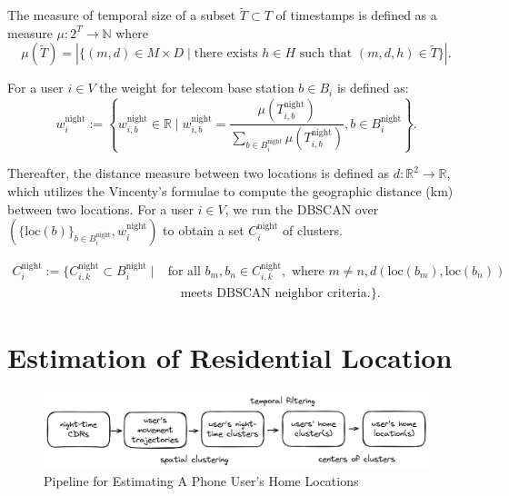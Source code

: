 \begin{function}
The measure of temporal size of a subset $\tilde{T} \subset T$ of timestamps is defined as a measure  $\mu: 2^T \rightarrow \mathbb{N}$ where
\begin{equation}\label{eq:temporal_size}
\mu(\tilde{T}) =
|
\{
(m, d) \in M \times D
\mid
\text{there exists } h \in H \text{ such that } (m, d, h) \in \tilde{T}
\}
|.
\end{equation}
\end{function}

\label{def:temporal_size}
\begin{definition}
For a user $i \in V$ the weight for telecom base station $b \in B_i$ is defined as:
\[
w_i^{\text{night}}
:= \left\{
    w^{\text{night}}_{i, b} \in \mathbb{R}
    \mid
    w^{\text{night}}_{i, b} = \frac{\mu(T^{\text{night}}_{i, b})}{\sum_{b \in B^\text{night}_i} \mu(T^{\text{night}}_{i, b})}, b \in B^{\text{night}}_i
\right\}.
\]
\end{definition}

Thereafter, the distance measure between two locations is defined as $d: \mathbb{R}^2 \rightarrow \mathbb{R}$, which utilizes the Vincenty's formulae to compute the geographic distance (km) between two locations. For a user $i \in V$, we run the DBSCAN over $(\{\text{loc}(b)\}_{b \in B^{\text{night}}_i}, w^{\text{night}}_i)$ to obtain a set $C^{\text{night}}_i$ of clusters.

\begin{definition}
\begin{align*}
C^{\text{night}}_i := \{
    C^{\text{night}}_{i, k} \subset B^{\text{night}}_i
    \mid
    &\text{for all } b_m, b_n \in C^{\text{night}}_{i, k}, \text{ where } m \neq n, d(\text{loc}(b_m), \text{loc}(b_n)) \\
    &\quad \text{meets DBSCAN neighbor criteria.}
\}.
\end{align*}
\end{definition}


\section{Estimation of Residential Location}\label{sec:estimation_of_residential_location}
\begin{figure}[h!]
\centering
\caption{Pipeline for Estimating A Phone User's Home Locations}
\vspace{0.1cm}

\includegraphics[scale=0.088]{figures/pipeline_home_locations.png}


\label{fig:pipeline_home_location}
\end{figure}

